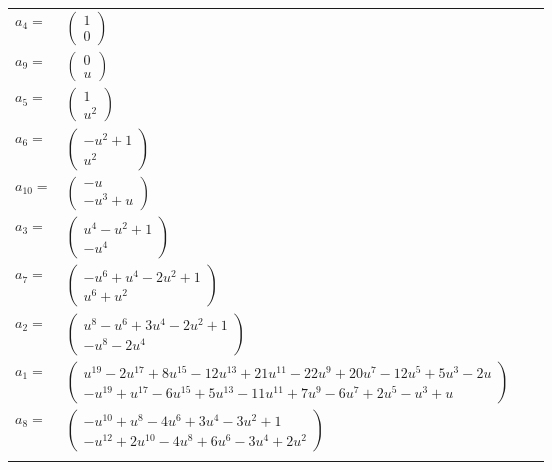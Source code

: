 \documentclass[1p]{elsarticle_modified}
\theoremstyle{definition}
\begin{document}
\begin{tabular}{m{7pt} m{180pt} m{7pt} m{180pt} }
\flushright $a_{4}=$&$\begin{pmatrix}1\\0\end{pmatrix}$ \\
\flushright $a_{9}=$&$\begin{pmatrix}0\\u\end{pmatrix}$ \\
\flushright $a_{5}=$&$\begin{pmatrix}1\\u^2\end{pmatrix}$ \\
\flushright $a_{6}=$&$\begin{pmatrix}- u^2+1\\u^2\end{pmatrix}$ \\
\flushright $a_{10}=$&$\begin{pmatrix}- u\\- u^3+u\end{pmatrix}$ \\
\flushright $a_{3}=$&$\begin{pmatrix}u^4- u^2+1\\- u^4\end{pmatrix}$ \\
\flushright $a_{7}=$&$\begin{pmatrix}- u^6+u^4-2 u^2+1\\u^6+u^2\end{pmatrix}$ \\
\flushright $a_{2}=$&$\begin{pmatrix}u^8- u^6+3 u^4-2 u^2+1\\- u^8-2 u^4\end{pmatrix}$ \\
\flushright $a_{1}=$&$\begin{pmatrix}u^{19}-2 u^{17}+8 u^{15}-12 u^{13}+21 u^{11}-22 u^9+20 u^7-12 u^5+5 u^3-2 u\\- u^{19}+u^{17}-6 u^{15}+5 u^{13}-11 u^{11}+7 u^9-6 u^7+2 u^5- u^3+u\end{pmatrix}$ \\
\flushright $a_{8}=$&$\begin{pmatrix}- u^{10}+u^8-4 u^6+3 u^4-3 u^2+1\\- u^{12}+2 u^{10}-4 u^8+6 u^6-3 u^4+2 u^2\end{pmatrix}$\\&\end{tabular}
\end{document}

